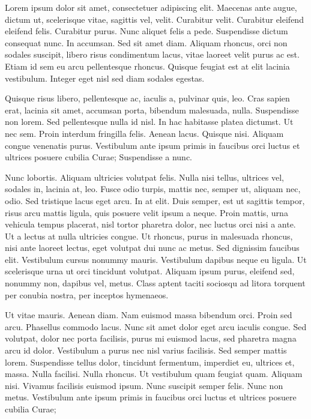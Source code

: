 %
%
Lorem ipsum dolor sit amet, consectetuer adipiscing elit. Maecenas ante augue, dictum ut, scelerisque vitae, sagittis vel, velit. Curabitur velit. Curabitur eleifend eleifend felis. Curabitur purus. Nunc aliquet felis a pede. Suspendisse dictum consequat nunc. In accumsan. Sed sit amet diam. Aliquam rhoncus, orci non sodales suscipit, libero risus condimentum lacus, vitae laoreet velit purus ac est. Etiam id sem eu arcu pellentesque rhoncus. Quisque feugiat est at elit lacinia vestibulum. Integer eget nisl sed diam sodales egestas.

Quisque risus libero, pellentesque ac, iaculis a, pulvinar quis, leo. Cras sapien erat, lacinia sit amet, accumsan porta, bibendum malesuada, nulla. Suspendisse non lorem. Sed pellentesque nulla id nisl. In hac habitasse platea dictumst. Ut nec sem. Proin interdum fringilla felis. Aenean lacus. Quisque nisi. Aliquam congue venenatis purus. Vestibulum ante ipsum primis in faucibus orci luctus et ultrices posuere cubilia Curae; Suspendisse a nunc.

Nunc lobortis. Aliquam ultricies volutpat felis. Nulla nisi tellus, ultrices vel, sodales in, lacinia at, leo. Fusce odio turpis, mattis nec, semper ut, aliquam nec, odio. Sed tristique lacus eget arcu. In at elit. Duis semper, est ut sagittis tempor, risus arcu mattis ligula, quis posuere velit ipsum a neque. Proin mattis, urna vehicula tempus placerat, nisl tortor pharetra dolor, nec luctus orci nisi a ante. Ut a lectus at nulla ultricies congue. Ut rhoncus, purus in malesuada rhoncus, nisi ante laoreet lectus, eget volutpat dui nunc ac metus. Sed dignissim faucibus elit. Vestibulum cursus nonummy mauris. Vestibulum dapibus neque eu ligula. Ut scelerisque urna ut orci tincidunt volutpat. Aliquam ipsum purus, eleifend sed, nonummy non, dapibus vel, metus. Class aptent taciti sociosqu ad litora torquent per conubia nostra, per inceptos hymenaeos.

Ut vitae mauris. Aenean diam. Nam euismod massa bibendum orci. Proin sed arcu. Phasellus commodo lacus. Nunc sit amet dolor eget arcu iaculis congue. Sed volutpat, dolor nec porta facilisis, purus mi euismod lacus, sed pharetra magna arcu id dolor. Vestibulum a purus nec nisl varius facilisis. Sed semper mattis lorem. Suspendisse tellus dolor, tincidunt fermentum, imperdiet eu, ultrices et, massa. Nulla facilisi. Nulla rhoncus. Ut vestibulum quam feugiat quam. Aliquam nisi. Vivamus facilisis euismod ipsum. Nunc suscipit semper felis. Nunc non metus. Vestibulum ante ipsum primis in faucibus orci luctus et ultrices posuere cubilia Curae;

